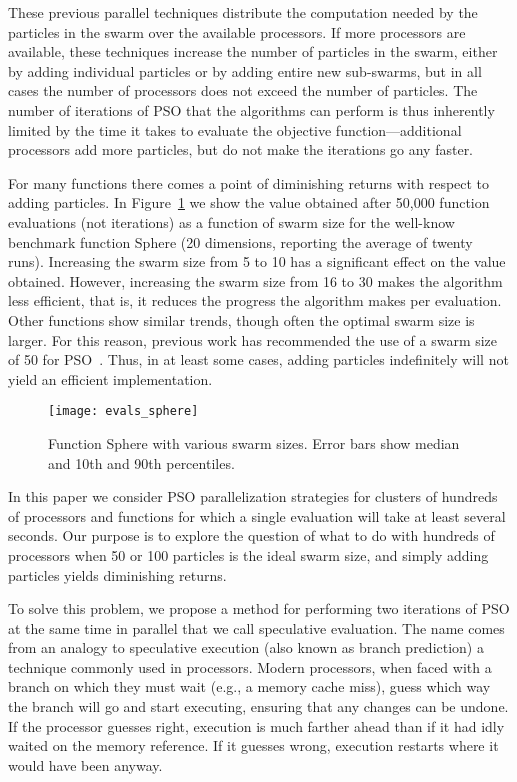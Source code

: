 \documentclass{llncs}
\newcommand{\fig}[1]{Figure~\ref{fig:#1}}
\begin{document}
These previous parallel techniques distribute the computation needed by the
particles in the swarm over the available processors.  If more processors are
available, these techniques increase the number of particles in the swarm,
either by adding individual particles or by adding entire new sub-swarms, but
in all cases the number of processors does not exceed the number of particles.
The number of iterations of PSO that the algorithms can perform is thus
inherently limited by the time it takes to evaluate the objective
function---additional processors add more particles, but do not make the
iterations go any faster.

For many functions there comes a point of diminishing returns with respect to
adding particles.  In \fig{evals-sphere} we show the value obtained after
50,000 function evaluations (not iterations) as a function of swarm size for
the well-know benchmark function Sphere (20 dimensions, reporting the average
of twenty runs).  Increasing the swarm size from 5 to 10 has a significant
effect on the value obtained.  However, increasing the swarm size from 16 to 30
makes the algorithm less efficient, that is, it reduces the progress the
algorithm makes per evaluation.  Other functions show similar trends, though
often the optimal swarm size is larger.  For this reason, previous
work has recommended the use of a swarm size of 50 for
PSO~\cite{bratton-2007-defining-a-standard-for-pso}.  Thus, in at least some
cases, adding particles indefinitely will not yield an efficient
implementation. 

\begin{figure}
  \centering
  \texttt{[image: evals\_sphere]}
  \caption{Function Sphere with various swarm sizes. Error bars show median and
  10th and 90th percentiles.}
  \label{fig:evals-sphere}
\end{figure}

In this paper we consider PSO parallelization strategies for clusters of
hundreds of processors and functions for which a single evaluation will take
at least several seconds.  Our purpose
is to explore the question of what to do with hundreds of processors when 50 or
100 particles is the ideal swarm size, and simply adding particles
yields diminishing returns.

To solve this problem, we propose a method for performing two iterations of PSO
at the same time in parallel that we call speculative evaluation.  The name
comes from an analogy to speculative execution (also known as branch
prediction) a technique commonly used in processors.  Modern processors, when
faced with a branch on which they must wait (e.g., a memory cache miss), guess
which way the branch will go and start executing, ensuring that any changes
can be undone.  If the processor guesses right, execution is
much farther ahead than if it had idly waited on the memory reference.  If
it guesses wrong, execution restarts where it would have been anyway.  
\end{document}
